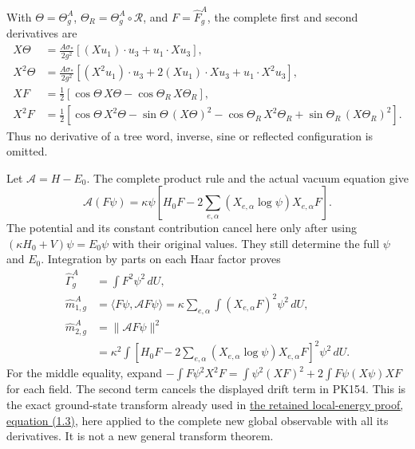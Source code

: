 \documentclass[11pt]{article}
\begin{document}
With \(\Theta=\Theta_g^A\), \(\Theta_R=\Theta_g^A\circ\mathcal R\),
and \(F=\widehat F_g^A\), the complete first and second derivatives are
\[
 \begin{split}
 X\Theta&=\frac{A\sigma_*}{2g^2}
       [(Xu_1)\cdot u_3+u_1\cdot Xu_3],\\
 X^2\Theta&=\frac{A\sigma_*}{2g^2}
       [(X^2u_1)\cdot u_3+2(Xu_1)\cdot Xu_3+u_1\cdot X^2u_3],\\
 XF&=\tfrac12[\cos\Theta\,X\Theta-\cos\Theta_R\,X\Theta_R],\\
 X^2F&=\tfrac12[\cos\Theta\,X^2\Theta-\sin\Theta\,(X\Theta)^2
                 -\cos\Theta_R\,X^2\Theta_R
                 +\sin\Theta_R\,(X\Theta_R)^2].
 \end{split}\tag{PK153}
\]
Thus no derivative of a tree word, inverse, sine or reflected
configuration is omitted.

Let \(\mathcal A=H-E_0\). The complete product rule and the actual
vacuum equation give
\[
 \mathcal A(F\psi)
 =\kappa\psi\left[H_0F
       -2\sum_{e,\alpha}(X_{e,\alpha}\log\psi)X_{e,\alpha}F\right].
 \tag{PK154}
\]
The potential and its constant contribution cancel here only after
using \((\kappa H_0+V)\psi=E_0\psi\) with their original values.
They still determine the full \(\psi\) and \(E_0\).
Integration by parts on each Haar factor proves
\[
 \begin{split}
 \widehat\Gamma_g^A
   &=\int F^2\psi^2\,dU,\\
 \widehat m_{1,g}^A
   &=\langle F\psi,\mathcal A F\psi\rangle
     =\kappa\sum_{e,\alpha}\int
                        (X_{e,\alpha}F)^2\psi^2\,dU,\\
 \widehat m_{2,g}^A
   &=\|\mathcal A F\psi\|^2\\
   &=\kappa^2\int
       \left[H_0F-2\sum_{e,\alpha}
            (X_{e,\alpha}\log\psi)X_{e,\alpha}F\right]^2\psi^2\,dU .
 \end{split}\tag{PK155}
\]
For the middle equality, expand
\(-\int F\psi^2X^2F=\int\psi^2(XF)^2+
2\int F\psi(X\psi)XF\) for each field. The second term cancels
the displayed drift term in PK154. This is the exact ground-state
transform already used in \href{https://github.com/KokunoYumeto/yang-mills-interacting-workbench/blob/713a0e145a1b17e81b4cd9f53c703a6a8b756610/yang-mills/sources/ym_gap_primary_20260908/local_energy_current_true_vacuum.md#L64}{the retained local-energy proof, equation (1.3)},
here applied to the complete new global observable with all its derivatives.
It is not a new general transform theorem.
\end{document}
